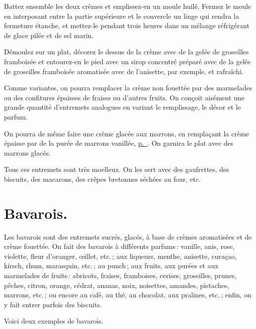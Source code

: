 Battez ensemble les deux crèmes et emplissez-en un moule huilé. Fermez le
moule en interposant entre la partie supérieure et le couvercle un linge qui rendra
la fermeture étanche, et mettez-le pendant trois heures dans un mélange réfrigérant
de glace pilée et de sel marin.

Démoulez sur un plat, décorez le dessus de la crème avec de la gelée de
groseilles framboisée et entourez-en le pied avec un sirop concentré préparé
avec de la gelée de groseilles framboisée aromatisée avec de l’anisette, par
exemple, et rafraîchi.

\sk

Comme variantes, on pourra remplacer la crème non fouettée par des marmelades
ou des confitures épaisses de fraises ou d'autres fruits. On conçoit aisément
une grande quantité d'entremets analogues en variant le remplissage, le décor
et le parfum.

On pourra de même faire une crème glacée aux marrons, en remplaçant la crème
épaisse par de la purée de marrons vanillée,
\hyperlink{p0902}{p. \pageref{pg0902}}. On garnira le plat avec des marrons
glacés.

Tous ces entremets sont très moelleux. On les sert avec des gaufrettes, des
biscuits, des macarons, des crêpes bretonnes séchées au four, etc.

\section*{\centering Bavarois.}
{}

Les bavarois sont des entremets sucrés, glacés, à base de crèmes aromatisées et
de crème fouettée. On fait des bavarois à différents parfums : vanille, anis,
rose, violette, fleur d'oranger, œillet, etc. ; aux liqueurs, menthe, anisette,
curaçao, kirsch, rhum, marasquin, etc. ; au punch ; aux fruits, aux purées et
aux marmelades de fruits : abricots, fraises, framboises, cerises, groseilles,
prunes, pêches, citron, orange, cédrat, ananas, noix, noisettes, amandes,
pistaches, marrons, etc. ; ou encore au café, au thé, au chocolat, aux
pralines, etc. ; enfin, on y fait entrer parfois des biscuits.

Voici deux exemples de bavarois.

\medskip

